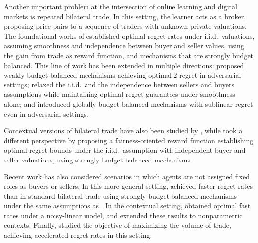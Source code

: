 \documentclass[final,12pt]{colt2025}
\begin{document}
Another important problem at the intersection of online learning and digital markets is repeated bilateral trade.
In this setting, the learner acts as a broker, proposing price pairs to a sequence of traders with unknown private valuations.
The foundational works of \citet{cesa2021regret,cesa2024bilateral} established optimal regret rates under i.i.d.\ valuations, assuming smoothness and independence between buyer and seller values, using the gain from trade as reward function, and mechanisms that are strongly budget balanced.
This line of work has been extended in multiple directions: \citet{azar2022alpha} proposed weakly budget-balanced mechanisms achieving optimal $2$-regret in adversarial settings; \citet{cesa2023repeated,JMLR:v25:23-1627} relaxed the i.i.d.\ and the independence between sellers and buyers assumptions while maintaining optimal regret guarantees under smoothness alone; and \citet{bernasconi2024no} introduced globally budget-balanced mechanisms with sublinear regret even in adversarial settings.

Contextual versions of bilateral trade have also been studied by \citet{GaucherBCCP25}, while \citet{fairgainfromtrade} took a different perspective by proposing a fairness-oriented reward function establishing optimal regret bounds under the i.i.d.\ assumption with independent buyer and seller valuations, using strongly budget-balanced mechanisms.

Recent work has also considered scenarios in which agents are not assigned fixed roles as buyers or sellers. In this more general setting, \citet{bolic2024online} achieved faster regret rates than in standard bilateral trade using strongly budget-balanced mechanisms under the same assumptions as \citet{cesa2021regret}. In the contextual setting, \citet{bachoc2025contextualLinear} obtained optimal fast rates under a noisy-linear model, and \citet{bachoc2025contextual} extended these results to nonparametric contexts. Finally, \citet{cesari2025volumeFairnesss} studied the objective of maximizing the volume of trade, achieving accelerated regret rates in this setting.
\end{document}
